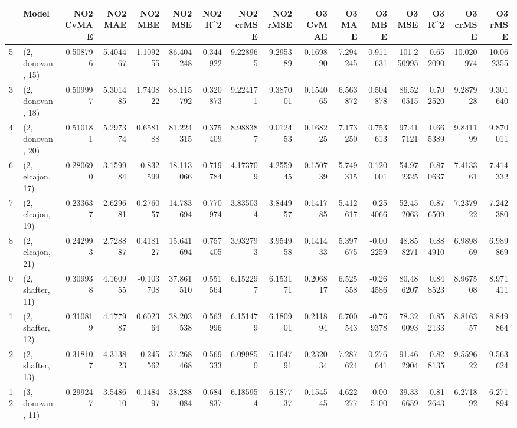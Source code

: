 \begin{tabular}{llrrrrrrrrrrrrrr}
\toprule
{} &             Model &  NO2 CvMAE &   NO2 MAE &   NO2 MBE &    NO2 MSE &   NO2 R\textasciicircum2 &  NO2 crMSE &  NO2 rMSE &  O3 CvMAE &    O3 MAE &    O3 MBE &      O3 MSE &    O3 R\textasciicircum2 &   O3 crMSE &    O3 rMSE \\
\midrule
5  &  (2, donovan, 15) &   0.508796 &  5.404467 &  1.109255 &  86.404248 &  0.344922 &   9.228965 &  9.295389 &  0.169890 &  7.294245 &  0.911631 &  101.250995 &  0.652090 &  10.020974 &  10.062355 \\
3  &  (2, donovan, 18) &   0.509997 &  5.301485 &  1.740822 &  88.115792 &  0.320873 &   9.224171 &  9.387001 &  0.154065 &  6.563872 &  0.504878 &   86.520515 &  0.702520 &   9.287928 &   9.301640 \\
4  &  (2, donovan, 20) &   0.510181 &  5.297374 &  0.658188 &  81.224315 &  0.375409 &   8.988387 &  9.012453 &  0.168225 &  7.173250 &  0.753613 &   97.417121 &  0.665389 &   9.841199 &   9.870011 \\
6  &  (2, elcajon, 17) &   0.280690 &  3.159984 & -0.832599 &  18.113066 &  0.719784 &   4.173709 &  4.255945 &  0.150739 &  5.749315 &  0.120001 &   54.972325 &  0.870637 &   7.413361 &   7.414332 \\
7  &  (2, elcajon, 19) &   0.233637 &  2.629681 &  0.276057 &  14.783694 &  0.770974 &   3.835034 &  3.844957 &  0.141785 &  5.412617 & -0.254066 &   52.452063 &  0.876509 &   7.237922 &   7.242380 \\
8  &  (2, elcajon, 21) &   0.242993 &  2.728887 &  0.418127 &  15.641694 &  0.757405 &   3.932793 &  3.954958 &  0.141433 &  5.397675 & -0.002259 &   48.858271 &  0.884910 &   6.989869 &   6.989869 \\
0  &  (2, shafter, 11) &   0.309938 &  4.160955 & -0.103708 &  37.861510 &  0.551564 &   6.152297 &  6.153171 &  0.206817 &  6.525558 & -0.264586 &   80.486207 &  0.848523 &   8.967508 &   8.971411 \\
1  &  (2, shafter, 12) &   0.310819 &  4.177987 &  0.602364 &  38.203538 &  0.563996 &   6.151479 &  6.180901 &  0.211894 &  6.700543 & -0.769378 &   78.320093 &  0.852133 &   8.816357 &   8.849864 \\
2  &  (2, shafter, 13) &   0.318107 &  4.313823 & -0.245562 &  37.268468 &  0.569333 &   6.099850 &  6.104791 &  0.232034 &  7.287624 &  0.276641 &   91.462904 &  0.828135 &   9.559622 &   9.563624 \\
12 &  (3, donovan, 11) &   0.299247 &  3.548610 &  0.148497 &  38.288084 &  0.684837 &   6.185954 &  6.187737 &  0.154545 &  4.622277 & -0.005100 &   39.336659 &  0.812643 &   6.271892 &   6.271894 \\

\end{tabular}
